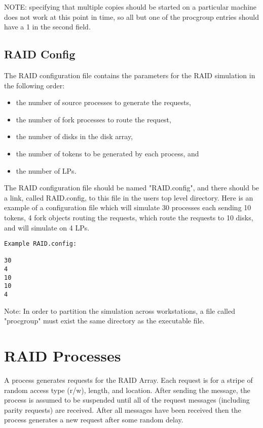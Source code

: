 \documentclass[11pt]{report}
\begin{document}
NOTE: specifying that multiple copies should be started on a particular
machine does not work at this point in time, so all but one of the
procgroup entries should have a 1 in the second field.

\section{RAID Config}

The RAID configuration file contains the parameters for the RAID
simulation in the following order:

\begin{itemize}
\item
the number of source processes to generate the requests,
\item
the number of fork processes to route the request, 
\item
the number of disks in the disk array,
\item
the number of tokens to be generated by each process, and
\item
the number of LPs.
\end{itemize}

The RAID configuration file should be named "RAID.config", and there
should be a link, called RAID.config, to this file in the users top
level directory.  Here is an example of a configuration file which will
simulate 30 processes each sending 10 tokens, 4 fork objects routing the
requests, which route the requests to 10 disks, and will simulate on
4 LPs.

\begin{verbatim}
Example RAID.config:

30
4
10
10
4
\end{verbatim}

Note: In order to partition the simulation across workstations, a file
called "procgroup" must exist the same directory as the executable
file.

\chapter{RAID Processes}

A process generates requests for the RAID Array.  Each request is for a
stripe of random access type (r/w), length, and location.  After sending
the message, the process is assumed to be suspended until all of the
request messages (including parity requests) are received.  After all
messages have been received then the process generates a new request
after some random delay.
\end{document}
